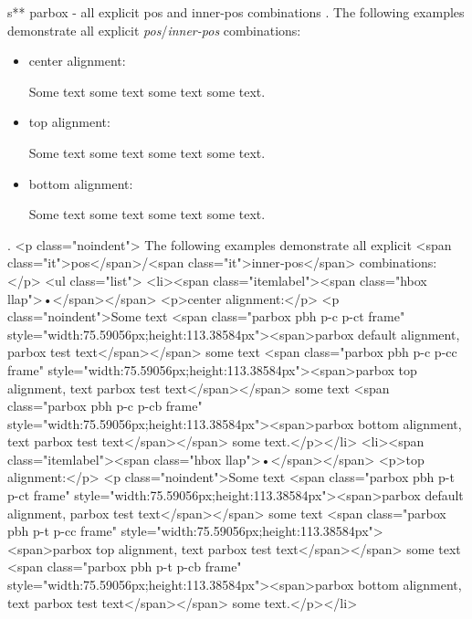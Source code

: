 s** parbox - all explicit pos and inner-pos combinations
.
\noindent
The following examples demonstrate all explicit \emph{pos}/\emph{inner-pos} combinations:
\begin{itemize}
\item center alignment:

\noindent
Some text
some text
some text
some text.

\item top alignment:

\noindent
Some text
some text
some text
some text.

\item bottom alignment:

\noindent
Some text
some text
some text
some text.
\end{itemize}
.
<p class="noindent">
The following examples demonstrate all explicit <span class="it">pos</span>/<span class="it">inner‐pos</span> combinations:
</p>
<ul class="list">
<li><span class="itemlabel"><span class="hbox llap">•</span></span>
<p>center alignment:</p>
<p class="noindent">Some text <span class="parbox pbh p-c p-ct frame" style="width:75.59056px;height:113.38584px"><span>parbox default alignment, parbox test text</span></span> some text <span class="parbox pbh p-c p-cc frame" style="width:75.59056px;height:113.38584px"><span>parbox top alignment, text parbox test text</span></span> some text <span class="parbox pbh p-c p-cb frame" style="width:75.59056px;height:113.38584px"><span>parbox bottom alignment, text parbox test text</span></span> some text.</p></li>
<li><span class="itemlabel"><span class="hbox llap">•</span></span>
<p>top alignment:</p>
<p class="noindent">Some text <span class="parbox pbh p-t p-ct frame" style="width:75.59056px;height:113.38584px"><span>parbox default alignment, parbox test text</span></span> some text <span class="parbox pbh p-t p-cc frame" style="width:75.59056px;height:113.38584px"><span>parbox top alignment, text parbox test text</span></span> some text <span class="parbox pbh p-t p-cb frame" style="width:75.59056px;height:113.38584px"><span>parbox bottom alignment, text parbox test text</span></span> some text.</p></li>
